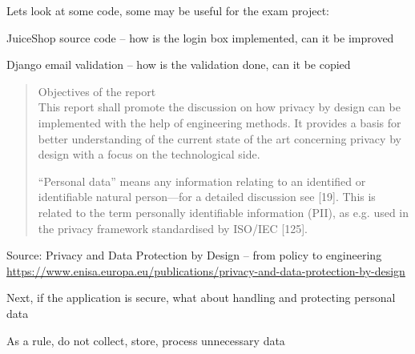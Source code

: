 \documentclass[Screen16to9,17pt]{foils}
\begin{document}




Lets look at some code, some may be useful for the exam project:
\begin{list2}
\item JuiceShop source code -- how is the login box implemented, can it be improved
\item Django email validation -- how is the validation done, can it be copied
\end{list2}




\begin{quote}
Objectives of the report\\
This report shall promote the discussion on how privacy by design can be implemented with the help
of engineering methods. It provides a basis for better understanding of the current state of the art
concerning privacy by design with a focus on the technological side.

“Personal data” means any information relating to an identified or identifiable natural person—for a
detailed discussion see [19]. This is related to the term personally identifiable information (PII), as e.g.
used in the privacy framework standardised by ISO/IEC [125].
\end{quote}
Source:
Privacy and Data Protection by Design
– from policy to engineering\\
{\footnotesize\url{https://www.enisa.europa.eu/publications/privacy-and-data-protection-by-design}}
\begin{list2}
\item Next, if the application is secure, what about handling and protecting personal data
\item As a rule, do not collect, store, process unnecessary data
\end{list2}

\end{document}
